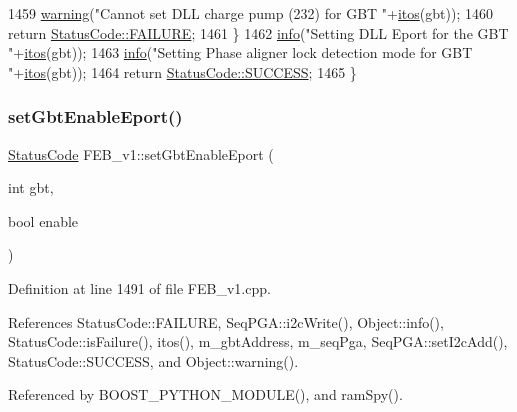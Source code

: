\begin{DoxyCode}
1459     \hyperlink{classObject_a65cd4fda577711660821fd2cd5a3b4c9}{warning}(\textcolor{stringliteral}{"Cannot set DLL charge pump (232) for GBT "}+\hyperlink{Tools_8h_af330027dbdafb9a30768b3613c553e60}{itos}(gbt));
1460     \textcolor{keywordflow}{return} \hyperlink{classStatusCode_a6f565cbeadc76d14c72f047e5e85eb4ba3da73d4c469762eb9d3c960368252b26}{StatusCode::FAILURE};
1461   \}
1462   \hyperlink{classObject_a644fd329ea4cb85f54fa6846484b84a8}{info}(\textcolor{stringliteral}{"Setting DLL Eport for the GBT "}+\hyperlink{Tools_8h_af330027dbdafb9a30768b3613c553e60}{itos}(gbt));
1463   \hyperlink{classObject_a644fd329ea4cb85f54fa6846484b84a8}{info}(\textcolor{stringliteral}{"Setting Phase aligner lock detection mode for GBT "}+\hyperlink{Tools_8h_af330027dbdafb9a30768b3613c553e60}{itos}(gbt));
1464   \textcolor{keywordflow}{return} \hyperlink{classStatusCode_a6f565cbeadc76d14c72f047e5e85eb4badd0da38d3ba0d922efd1f4619bc37ad8}{StatusCode::SUCCESS};
1465 \}
\end{DoxyCode}
\mbox{\label{classFEB__v1_a30ce0e679748a4e2bf7f953b2162618f}} 
\subsubsection{\texorpdfstring{set\+Gbt\+Enable\+Eport()}{setGbtEnableEport()}}
{\footnotesize\ttfamily \hyperlink{classStatusCode}{Status\+Code} F\+E\+B\+\_\+v1\+::set\+Gbt\+Enable\+Eport (\begin{DoxyParamCaption}\item[{int}]{gbt,  }\item[{bool}]{enable }\end{DoxyParamCaption})}



Definition at line 1491 of file F\+E\+B\+\_\+v1.\+cpp.



References Status\+Code\+::\+F\+A\+I\+L\+U\+RE, Seq\+P\+G\+A\+::i2c\+Write(), Object\+::info(), Status\+Code\+::is\+Failure(), itos(), m\+\_\+gbt\+Address, m\+\_\+seq\+Pga, Seq\+P\+G\+A\+::set\+I2c\+Add(), Status\+Code\+::\+S\+U\+C\+C\+E\+SS, and Object\+::warning().



Referenced by B\+O\+O\+S\+T\+\_\+\+P\+Y\+T\+H\+O\+N\+\_\+\+M\+O\+D\+U\+L\+E(), and ram\+Spy().



